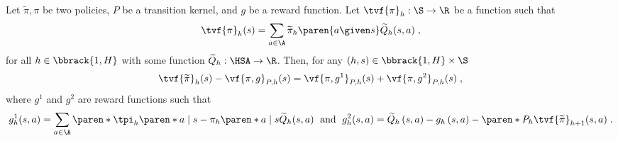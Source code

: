 \begin{lemma}\label{lemma:extended value difference}
Let $\widetilde{\pi}, \pi$ be two policies, $P$ be a transition kernel, and $g$ be a reward function.
Let $\tvf{\pi}_h: \S \to \R$ be a function such that 
$$
\tvf{\pi}_h(s) = \sum_{a\in \A}\widetilde{\pi}_h\paren{a\given s} \widetilde{Q}_h(s, a)\;,$$ 
for all $h \in \bbrack{1, H}$ with some function $\widetilde{Q}_h: \HSA \to \R$.
Then, for any $(h, s) \in \bbrack{1, H}\times \S$
\begin{align*}
\tvf{\widetilde{\pi}}_h(s)-\vf{\pi, g}_{P, h}(s) 
= 
\vf{\pi, g^1}_{P, h}(s) 
+ \vf{\pi, g^2}_{P, h}(s)\;,
\end{align*}
where $g^1$ and $g^2$ are reward functions such that
\begin{align*}
g^1_h(s, a) = \sum_{a \in \A} \paren*{\tpi_h\paren*{a\mid s}-\pi_h\paren*{a \mid s}}\widetilde{Q}_h(s, a)\;
\text{ and }\;
g^2_h(s, a) = 
\widetilde{Q}_h\left(s, a \right)-g_h\left(s, a\right)-\paren*{P_h\tvf{\widetilde{\pi}}_{h+1}}(s, a)\;.
\end{align*}
\end{lemma}

